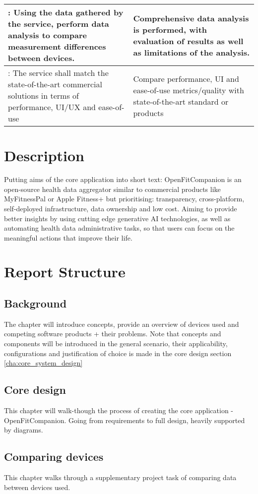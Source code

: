 \begin{center}
\begin{tabularx}{1\textwidth} {| >{\centering\arraybackslash}X 
        | >{\centering\arraybackslash}X 
        |}
    \hline
     7: Using the data gathered by the service, perform data analysis to compare measurement differences between devices. &  Comprehensive data analysis is performed, with evaluation of results as well as limitations of the analysis.\\
     \hline
     8: The service shall match the state-of-the-art commercial solutions in terms of performance, UI/UX and ease-of-use & Compare performance, UI and ease-of-use metrics/quality with state-of-the-art standard or products  \\
     \hline
    \end{tabularx}
\end{center}
\section{Description}
Putting aims of the core application into short text: OpenFitCompanion is an open-source health data aggregator similar to commercial products like MyFitnessPal or Apple Fitness+ but prioritising: transparency, cross-platform, self-deployed infrastructure, data ownership and low cost. Aiming to provide better insights by using cutting edge generative AI technologies, as well as automating health data administrative tasks, so that users can focus on the meaningful actions that improve their life.
\section{Report Structure}
\subsection{Background}
The chapter will introduce concepts, provide an overview of devices used and competing software products + their problems. Note that concepts and components will be introduced in the general scenario, their applicability, configurations and justification of choice is made in the core design section \ref{cha:core_system_design}
\subsection{Core design}
This chapter will walk-though the process of creating the core application - OpenFitCompanion. Going from requirements to full design, heavily supported by diagrams.
\subsection{Comparing devices}
This chapter walks through a supplementary project task of comparing data between devices used.
